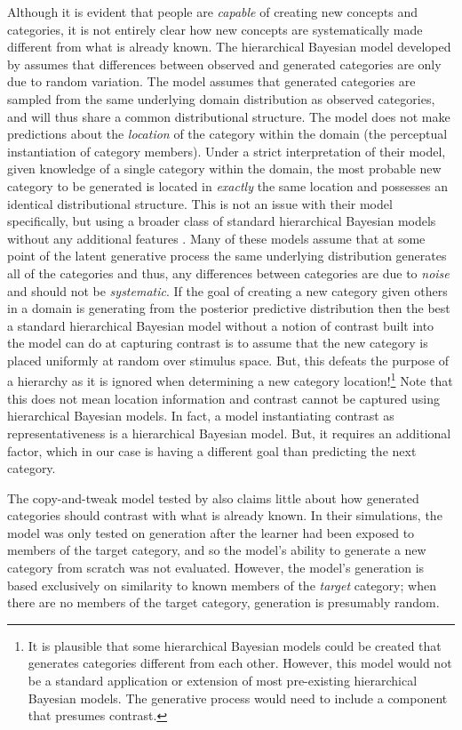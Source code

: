 \documentclass[12pt]{article}
\begin{document}
\begin{flushleft}
Although it is evident that people are {\em capable} of creating new concepts
and categories, it is not entirely clear how new concepts are systematically
made different from what is already known. The hierarchical Bayesian model
developed by \cite{jern2013probabilistic} assumes that differences between
observed and generated categories are only due to random variation. The model
assumes that generated categories are sampled from the same underlying domain
distribution as observed categories, and will thus share a common distributional
structure. The model does not make predictions about the {\em location} of the
category within the domain (the perceptual instantiation of category members).
Under a strict interpretation of their model, given knowledge of a single
category within the domain, the most probable new category to be generated is
located in {\em exactly} the same location and possesses an identical
distributional structure. This is not an issue with their model specifically,
but using a broader class of standard hierarchical Bayesian models without any
additional features \citep[e.g., ][]{griffithsscn07,kemp07}. Many of these
models assume that at some point of the latent generative process the same
underlying distribution generates all of the categories and thus, any
differences between categories are due to {\em noise} and should not be {\em
  systematic}. If the goal of creating a new category given others in a domain
is generating from the posterior predictive distribution then the best a
standard hierarchical Bayesian model without a notion of contrast built into the
model can do at capturing contrast is to assume that the new category is placed
uniformly at random over stimulus space. But, this defeats the purpose of a
hierarchy as it is ignored when determining a new category location!\footnote{It
  is plausible that some hierarchical Bayesian models could be created that
  generates categories different from each other. However, this model would not
  be a standard application or extension of most pre-existing hierarchical
  Bayesian models. The generative process would need to include a component that
  presumes contrast.} Note that this does not mean location information and
contrast cannot be captured using hierarchical Bayesian models. In fact, a model
instantiating contrast as representativeness is a hierarchical Bayesian model.
But, it requires an additional factor, which in our case is having a different
goal than predicting the next category.

The copy-and-tweak model tested by \cite{jern2013probabilistic} also claims
little about how generated categories should contrast with what is already
known. In their simulations, the model was only tested on generation after the
learner had been exposed to members of the target category, and so the model's
ability to generate a new category from scratch was not evaluated. However, the
model's generation is based exclusively on similarity to known members of the
{\em target} category; when there are no members of the target category,
generation is presumably random.


\end{flushleft}
\end{document}
